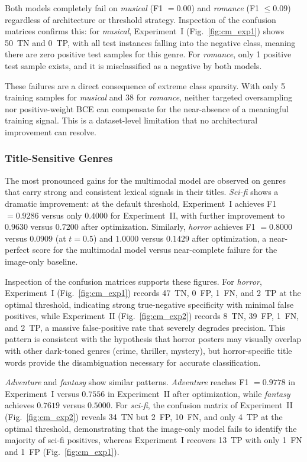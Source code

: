 \documentclass[conference]{IEEEtran}
\begin{document}
Both models completely fail on \textit{musical} (F1 $= 0.00$) and
\textit{romance} (F1 $\leq 0.09$) regardless of architecture or
threshold strategy. Inspection of the confusion matrices confirms
this: for \textit{musical}, Experiment~I (Fig.~\ref{fig:cm_exp1})
shows 50~TN and 0~TP, with all test instances falling into the
negative class, meaning there are zero positive test samples for
this genre. For \textit{romance}, only 1 positive test sample exists,
and it is misclassified as a negative by both models.

These failures are a direct consequence of extreme class sparsity.
With only 5 training samples for \textit{musical} and 38 for
\textit{romance}, neither targeted oversampling nor positive-weight
BCE can compensate for the near-absence of a meaningful training
signal. This is a dataset-level limitation that no architectural
improvement can resolve.

\subsubsection{Title-Sensitive Genres}

The most pronounced gains for the multimodal model are observed on
genres that carry strong and consistent lexical signals in their titles.
\textit{Sci-fi} shows a dramatic improvement: at the default threshold,
Experiment~I achieves F1 $= 0.9286$ versus only $0.4000$ for
Experiment~II, with further improvement to $0.9630$ versus $0.7200$
after optimization. Similarly, \textit{horror} achieves F1 $= 0.8000$
versus $0.0909$ (at $t = 0.5$) and $1.0000$ versus $0.1429$ after
optimization, a near-perfect score for the multimodal model versus
near-complete failure for the image-only baseline.

Inspection of the confusion matrices supports these figures.
For \textit{horror}, Experiment~I (Fig.~\ref{fig:cm_exp1}) records
47~TN, 0~FP, 1~FN, and 2~TP at the optimal threshold, indicating
strong true-negative specificity with minimal false positives, while
Experiment~II (Fig.~\ref{fig:cm_exp2}) records 8~TN, 39~FP, 1~FN,
and 2~TP, a massive false-positive rate that severely degrades
precision. This pattern is consistent with the hypothesis that horror
posters may visually overlap with other dark-toned genres (crime,
thriller, mystery), but horror-specific title words provide the
disambiguation necessary for accurate classification.

\textit{Adventure} and \textit{fantasy} show similar patterns.
\textit{Adventure} reaches F1 $= 0.9778$ in Experiment~I versus
$0.7556$ in Experiment~II after optimization, while
\textit{fantasy} achieves $0.7619$ versus $0.5000$.
For \textit{sci-fi}, the confusion matrix of Experiment~II
(Fig.~\ref{fig:cm_exp2}) reveals 34~TN but 2~FP, 10~FN, and only
4~TP at the optimal threshold, demonstrating that the image-only
model fails to identify the majority of sci-fi positives, whereas
Experiment~I recovers 13~TP with only 1~FN and 1~FP
(Fig.~\ref{fig:cm_exp1}).
\end{document}
